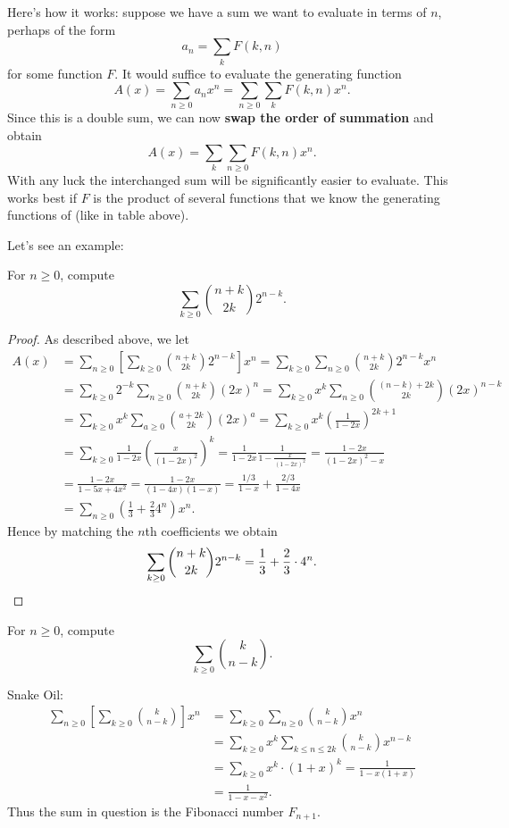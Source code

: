 \documentclass[11pt]{scrartcl}
\begin{document}
Here's how it works: suppose we have a sum we want to evaluate in terms of $n$,
perhaps of the form
\[ a_n = \sum_k F(k,n) \]
for some function $F$.
It would suffice to evaluate the generating function
\[ A(x) = \sum_{n \ge 0} a_n x^n = \sum_{n \ge 0} \sum_k F(k,n) x^n. \]
Since this is a double sum, we can now
\textbf{swap the order of summation} and obtain
\[ A(x) = \sum_k \sum_{n \ge 0} F(k,n) x^n. \]
With any luck the interchanged sum
will be significantly easier to evaluate.
This works best if $F$ is the product of several functions
that we know the generating functions of (like in table above).

Let's see an example:
\begin{example}
  For $n \ge 0$, compute
  \[ \sum_{k \ge 0} \binom{n+k}{2k} 2^{n-k}. \]
\end{example}
\begin{proof}
  As described above, we let
  \begin{align*}
    A(x) &= \sum_{n \ge 0}
    \left[ \sum_{k \ge 0} \binom{n+k}{2k} 2^{n-k} \right] x^n
    = \sum_{k \ge 0} \sum_{n \ge 0}
    \binom{n+k}{2k} 2^{n-k} x^n \\
    &= \sum_{k \ge 0} 2^{-k}
    \sum_{n \ge 0} \binom{n+k}{2k} (2x)^n
    = \sum_{k \ge 0} x^k
    \sum_{n \ge 0} \binom{(n-k) + 2k}{2k} (2x)^{n-k} \\
    &= \sum_{k \ge 0} x^k
    \sum_{a \ge 0} \binom{a + 2k}{2k} (2x)^{a}
    = \sum_{k \ge 0} x^k \left( \frac{1}{1-2x} \right)^{2k+1} \\
    &= \sum_{k \ge 0}
    \frac{1}{1-2x} \left( \frac{x}{(1-2x)^2} \right)^k
    =
    \frac{1}{1-2x} \frac{1}{1 - \frac{x}{(1-2x)^2}}
    = \frac{1-2x}{(1-2x)^2 - x} \\
    &= \frac{1-2x}{1-5x+4x^2}
    = \frac{1-2x}{(1-4x)(1-x)}
    = \frac{1/3}{1-x} + \frac{2/3}{1-4x} \\
    &= \sum_{n \ge 0} \left( \frac13 + \frac23 4^n \right)x^n.
  \end{align*}
  Hence by matching the $n$th coefficients we obtain
  \[
    \sum_{k \ge 0} \binom{n+k}{2k} 2^{n-k}
    = \frac{1}{3} + \frac{2}{3} \cdot 4^n. \qedhere
  \]
\end{proof}

\begin{example}
  For $n \ge 0$, compute
  \[ \sum_{k \ge 0} \binom{k}{n-k} . \] %
\end{example}
\begin{soln}
  Snake Oil:
  \begin{align*}
    \sum_{n \ge 0} \left[ \sum_{k \ge 0} \binom{k}{n-k} \right] x^n
    &= \sum_{k \ge 0} \sum_{n \ge 0}\binom{k}{n-k} x^n \\
    &= \sum_{k \ge 0} x^k \sum_{k \le n \le 2k}\binom{k}{n-k} x^{n-k} \\
    &= \sum_{k \ge 0} x^k \cdot (1+x)^k
      = \frac{1}{1-x(1+x)} \\
    &= \frac{1}{1-x-x^2}.
  \end{align*}
  Thus the sum in question is the Fibonacci number $F_{n+1}$.
\end{soln}
\end{document}
